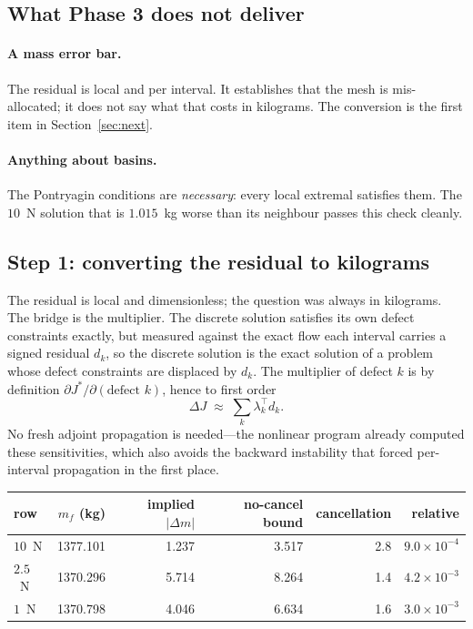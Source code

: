 \documentclass[11pt]{article}
\newcommand{\mf}{m_f}
\begin{document}
\subsection{What Phase 3 does not deliver}

\paragraph{A mass error bar.} The residual is local and per interval. It
establishes that the mesh is mis-allocated; it does not say what that costs in
kilograms. The conversion is the first item in Section~\ref{sec:next}.

\paragraph{Anything about basins.} The Pontryagin conditions are
\emph{necessary}: every local extremal satisfies them. The $10$~N solution that
is $1.015$~kg worse than its neighbour passes this check cleanly.

\subsection{Step 1: converting the residual to kilograms}

The residual is local and dimensionless; the question was always in kilograms.
The bridge is the multiplier. The discrete solution satisfies its own defect
constraints exactly, but measured against the exact flow each interval carries
a signed residual $d_k$, so the discrete solution is the exact solution of a
problem whose defect constraints are displaced by $d_k$. The multiplier of
defect $k$ is by definition $\partial J^*/\partial(\text{defect }k)$, hence to
first order
\begin{equation}
  \Delta J \;\approx\; \sum_k \lambda_k^{\!\top} d_k .
  \label{eq:sens}
\end{equation}
No fresh adjoint propagation is needed---the nonlinear program already computed
these sensitivities, which also avoids the backward instability that forced
per-interval propagation in the first place.

\begin{table}[h]
\centering\small
\begin{tabular}{lrrrrr}
\toprule
row & $\mf$ (kg) & implied $|\Delta m|$ & no-cancel bound & cancellation & relative \\
\midrule
$10$~N  & 1377.101 & 1.237 & 3.517 & 2.8 & $9.0\times10^{-4}$ \\
$2.5$~N & 1370.296 & 5.714 & 8.264 & 1.4 & $4.2\times10^{-3}$ \\
$1$~N   & 1370.798 & 4.046 & 6.634 & 1.6 & $3.0\times10^{-3}$ \\
\bottomrule
\end{tabular}
\end{table}
\end{document}
